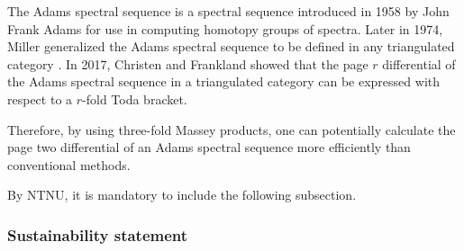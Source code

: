 The Adams spectral sequence is a spectral sequence introduced in 1958 by John Frank Adams for use in computing homotopy groups of spectra. Later in 1974, Miller generalized the Adams spectral sequence to be defined in any triangulated category \cite[Chapter I]{Miller_1975}. In 2017, Christen and Frankland \cite[Section 4, Section 6]{Christensen-Frankland_2017} showed that the page \( r \) differential of the Adams spectral sequence in a triangulated category can be expressed with respect to a \( r \)-fold Toda bracket.

Therefore, by using three-fold Massey products, one can potentially calculate the page two differential of an Adams spectral sequence more efficiently than conventional methods.

By NTNU, it is mandatory to include the following subsection.
\subsubsection{Sustainability statement}

